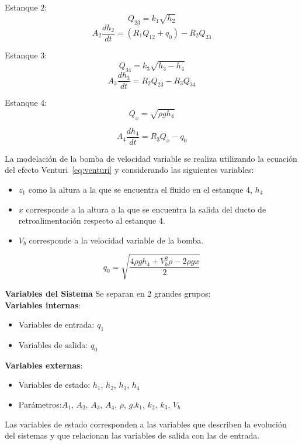 \documentclass[11pt,letterpaper,spanish,notitlepage]{report}
\begin{document}
\justify Estanque 2:
\begin{equation}
    Q_{23}=k_{1}\sqrt{h_{2}}
\end{equation}
\begin{equation}
    A_{2}\frac{dh_{2}}{dt} = (R_{1}Q_{12}+q_{0})-R_{2}Q_{23}
\end{equation}

\justify Estanque 3:
\begin{equation}
    Q_{34}=k_{3}\sqrt{h_{3}-h_{4}}
\end{equation}
\begin{equation}
    A_{3}\frac{dh_{3}}{dt} = R_{2}Q_{23}-R_{3}Q_{34}
\end{equation}

\justify Estanque 4:
\begin{equation}
    Q_{x}= \sqrt{\rho gh_{4}}
\end{equation}

\begin{equation}
    A_{4}\frac{dh_{4}}{dt} = R_{3}Q_{x}-q_{0}
\end{equation}




\justify La modelación de la bomba de velocidad variable se realiza utilizando la ecuación del efecto Venturi~\ref{eq:venturi} y considerando las siguientes variables:
\begin{itemize}
    \item $z_{1}$ como la altura a la que se encuentra el fluido en el estanque 4, $h_{4}$\\
    \item $x$ corresponde a la altura a la que se encuentra la salida del ducto de retroalimentación respecto al estanque 4.
    \item $V_{b}$ corresponde a la velocidad variable de la bomba.
    \end{itemize}

\begin{equation}
    q_{0} = \sqrt{\frac{4\rho gh_{4}+V_{b}^{2}\rho-2\rho gx}{2}}
\end{equation}


\newpage


   
\textbf{Variables del Sistema}
 \justify Se separan en 2 grandes grupos:\\ %
 \textbf{Variables internas}:
    \begin{itemize}
     \item Variables de entrada: $q_{1}$
     \item Variables de salida: $q_{0}$
     \end{itemize}
 \textbf{Variables externas}:
 \begin{itemize}
     \item Variables de estado: $h_{1}$, $h_{2}$, $h_{3}$, $h_{4}$
     \item Parámetros:$A_{1}$, $A_{2}$, $A_{3}$, $A_{4}$, $\rho$, $g$,$k_{1}$, $k_{2}$, $k_{3}$, $V_{b}$
     \end{itemize} 
 \justify Las variables de estado corresponden a las variables que describen la evolución del sistemas y que relacionan las variables de salida con las de entrada.\\
\end{document}

